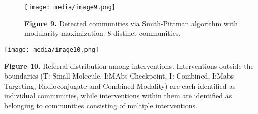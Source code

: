 \begin{figure}
\centering
\texttt{[image: media/image9.png]}
\caption{\textbf{Figure 9.} Detected communities via Smith-Pittman
algorithm with modularity maximization. 8 distinct communities.}
\end{figure}

\texttt{[image: media/image10.png]}

\textbf{Figure 10.} Referral distribution among interventions.
Interventions outside the boundaries (T: Small Molecule, I:MAbs
Checkpoint, I: Combined, I:Mabs Targeting, Radioconjugate and Combined
Modality) are each identified as individual communities, while
interventions within them are identified as belonging to communities
consisting of multiple interventions.

